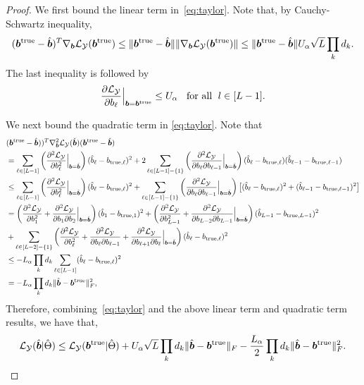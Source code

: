 \documentclass[11pt]{article}
\theoremstyle{plain}
\theoremstyle{definition}
\begin{document}
\begin{proof}
We first bound the linear term in~\eqref{eq:taylor}. Note that, by Cauchy-Schwartz inequality,
\begin{equation}\label{eq:linear}
(\bm{b}^{\text{true}}-\hat{\bm{b}})^T\nabla_{\bm{b}}\mathcal{L}_{\mathcal{Y}}(\bm{b}^{\text{true}})\leq \|\bm{b}^{\text{true}}-\hat{\bm{b}}\|\|\nabla_{\bm{b}}\mathcal{L}_{\mathcal{Y}}(\bm{b}^{\text{true}})\|
\leq \|\bm{b}^{\text{true}}-\hat{\bm{b}}\|U_\alpha\sqrt{L} \prod_k d_k .\end{equation}
The last inequality is followed by
\[
{\partial \mathcal{L}_{\mathcal{Y}}\over \partial b_\ell}\Big|_{\bm{b}=\bm{b}^{\text{true}}} \leq U_\alpha \;\; \textrm{ for all } \; l\in [L-1].
\]

We next bound the quadratic term in \eqref{eq:taylor}. Note that
\begin{align}\label{eq:quadratic}
 &(\bm{b}^{\text{true}}-\hat{\bm{b}}))^T \nabla^2_{\bm{b}}\mathcal{L}_{\mathcal{Y}}(\check{\bm{b}})(\bm{b}^{\text{true}}-\hat{\bm{b}})\\
 &=\sum_{\ell\in [L-1]} \left( {\partial^2\mathcal{L}_{\mathcal{Y}}\over \partial b^2_\ell} \Big|_{\bm{b}=\check{\bm{b}}} \right)(\hat b_\ell-b_{{\text{true}},\ell})^2 + 2\sum_{\ell\in[L-1]-\{1\}}\left( {\partial^2\mathcal{L}_{\mathcal{Y}}\over \partial b_\ell \partial b_{\ell-1}} \Big|_{\bm{b}=\check{\bm{b}}} \right)(\hat b_\ell-b_{{\text{true}},\ell})(\hat b_{\ell-1}-b_{{\text{true}},\ell-1}) \nonumber \\
&\leq \sum_{\ell\in [L-1]} \left( {\partial^2\mathcal{L}_{\mathcal{Y}}\over \partial b^2_\ell} \Big|_{\bm{b}=\check{\bm{b}}} \right)(\hat b_\ell-b_{{\text{true}},\ell})^2 + \sum_{\ell\in[L-1]-\{1\}}\left( {\partial^2\mathcal{L}_{\mathcal{Y}}\over \partial b_\ell \partial b_{\ell-1}} \Big|_{\bm{b}=\check{\bm{b}}} \right)\big[(\hat b_\ell-b_{{\text{true}},\ell})^2 +(\hat b_{\ell-1}-b_{{\text{true}},\ell-1})^2\big] \nonumber \\
&=\left( {\partial^2\mathcal{L}_{\mathcal{Y}}\over \partial b^2_1}+{\partial^2\mathcal{L}_{\mathcal{Y}}\over \partial b_1 \partial b_2 }\Big|_{\bm{b}=\check{\bm{b}}} \right)(\hat b_1-b_{{\text{true}},1})^2+\left( {\partial^2\mathcal{L}_{\mathcal{Y}}\over \partial b^2_{L-1}}+{\partial^2\mathcal{L}_{\mathcal{Y}}\over \partial b_{L-2} \partial b_{L-1} }\Big|_{\bm{b}=\check{\bm{b}}} \right)(\hat b_{L-1}-b_{{\text{true}},L-1})^2  \\
&+\sum_{\ell\in[L-2]-\{1\}}\left( {\partial^2\mathcal{L}_{\mathcal{Y}}\over \partial b^2_\ell}+{\partial^2\mathcal{L}_{\mathcal{Y}}\over \partial b_\ell \partial b_{\ell-1}}+{\partial^2\mathcal{L}_{\mathcal{Y}}\over \partial b_{\ell+1} \partial b_{\ell}} \Big|_{\bm{b}=\check{\bm{b}}} \right)(\hat b_\ell-b_{{\text{true}},\ell})^2     \\
&\leq - L_\alpha\prod_k d_k \sum_{\ell \in [L-1]}(\hat b_\ell-b_{\text{true},\ell})^2 \nonumber \\
&=-L_\alpha\prod_k d_k\lVert\hat{\bm{b}}-\bm{b}^{\text{true}}\rVert_F^2,
\end{align}
Therefore, combining~\eqref{eq:taylor} and the above linear term and quadratic term results, we have that,
\[
\mathcal{L}_{\mathcal{Y}}(\hat{\bm{b}}|\hat\Theta)\leq \mathcal{L}_{\mathcal{Y}}(\bm{b}^{\text{true}}|\hat\Theta)+U_\alpha\sqrt{L}\prod_k d_k\lVert\hat{\bm{b}}-\bm{b}^{\text{true}}\rVert_F -\frac{L_\alpha}{2}\prod_k d_k \lVert\hat{\bm{b}}-\bm{b}^{\text{true}}\rVert_F^2 .
\]


\end{proof}
\end{document}
